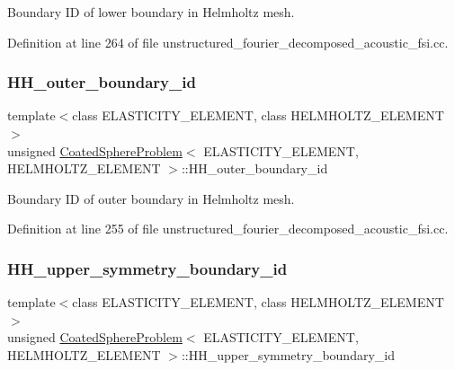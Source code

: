 Boundary ID of lower boundary in Helmholtz mesh. 



Definition at line 264 of file unstructured\+\_\+fourier\+\_\+decomposed\+\_\+acoustic\+\_\+fsi.\+cc.

\mbox{\label{classCoatedSphereProblem_a7462cad0a109f08ee2dcff2b45bff9bc}} 
\subsubsection{\texorpdfstring{H\+H\+\_\+outer\+\_\+boundary\+\_\+id}{HH\_outer\_boundary\_id}}
{\footnotesize\ttfamily template$<$class E\+L\+A\+S\+T\+I\+C\+I\+T\+Y\+\_\+\+E\+L\+E\+M\+E\+NT, class H\+E\+L\+M\+H\+O\+L\+T\+Z\+\_\+\+E\+L\+E\+M\+E\+NT$>$ \\
unsigned \hyperlink{classCoatedSphereProblem}{Coated\+Sphere\+Problem}$<$ E\+L\+A\+S\+T\+I\+C\+I\+T\+Y\+\_\+\+E\+L\+E\+M\+E\+NT, H\+E\+L\+M\+H\+O\+L\+T\+Z\+\_\+\+E\+L\+E\+M\+E\+NT $>$\+::H\+H\+\_\+outer\+\_\+boundary\+\_\+id\hspace{0.3cm}{\ttfamily [private]}}



Boundary ID of outer boundary in Helmholtz mesh. 



Definition at line 255 of file unstructured\+\_\+fourier\+\_\+decomposed\+\_\+acoustic\+\_\+fsi.\+cc.

\mbox{\label{classCoatedSphereProblem_a020701b863392278cc7e1dfb3ff8fc3b}} 
\subsubsection{\texorpdfstring{H\+H\+\_\+upper\+\_\+symmetry\+\_\+boundary\+\_\+id}{HH\_upper\_symmetry\_boundary\_id}}
{\footnotesize\ttfamily template$<$class E\+L\+A\+S\+T\+I\+C\+I\+T\+Y\+\_\+\+E\+L\+E\+M\+E\+NT, class H\+E\+L\+M\+H\+O\+L\+T\+Z\+\_\+\+E\+L\+E\+M\+E\+NT$>$ \\
unsigned \hyperlink{classCoatedSphereProblem}{Coated\+Sphere\+Problem}$<$ E\+L\+A\+S\+T\+I\+C\+I\+T\+Y\+\_\+\+E\+L\+E\+M\+E\+NT, H\+E\+L\+M\+H\+O\+L\+T\+Z\+\_\+\+E\+L\+E\+M\+E\+NT $>$\+::H\+H\+\_\+upper\+\_\+symmetry\+\_\+boundary\+\_\+id\hspace{0.3cm}{\ttfamily [private]}}




